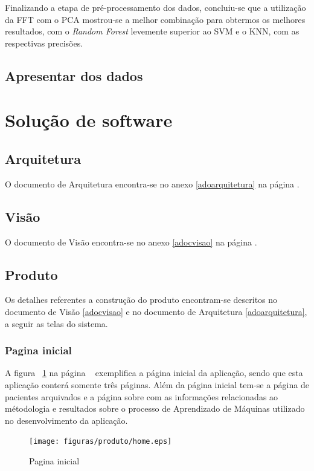 Finalizando a etapa de pré-processamento dos dados, concluiu-se que a utilização da FFT com o PCA mostrou-se a melhor combinação para obtermos os melhores resultados, com o \textit{Random Forest} levemente superior ao SVM e o KNN, com as respectivas precisões.

\subsection{Apresentar dos dados}

\section{Solução de software}
\subsection{Arquitetura}
O documento de Arquitetura encontra-se no anexo \ref{adoarquitetura} na página \pageref{adoarquitetura}.

\subsection{Visão}
O documento de Visão encontra-se no anexo \ref{adocvisao} na página \pageref{adocvisao}.

\subsection{Produto}
Os detalhes referentes a construção do produto encontram-se descritos no documento de Visão \ref{adocvisao} e no documento de Arquitetura \ref{adoarquitetura}, a seguir as telas do sistema.


\subsubsection{Pagina inicial}
A figura ~\ref{fighome} na página ~\pageref{fighome} exemplifica a página inicial da aplicação, sendo que esta aplicação  conterá somente três páginas. Além da página inicial tem-se a página de pacientes arquivados e a página sobre com as informações relacionadas ao métodologia e resultados sobre o processo de Aprendizado de Máquinas utilizado no desenvolvimento da aplicação.

\begin{figure}[!htb]
	\centering
	\texttt{[image: figuras/produto/home.eps]}
	\caption{Pagina inicial}
	\label{fighome}
\end{figure}

